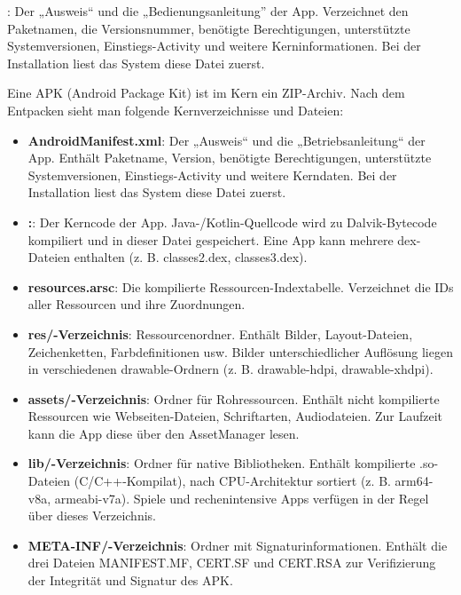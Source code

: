 
: Der „Ausweis“ und die „Bedienungsanleitung” der App. Verzeichnet den Paketnamen, die Versionsnummer, benötigte Berechtigungen, unterstützte Systemversionen, Einstiegs-Activity und weitere Kerninformationen. Bei der Installation liest das System diese Datei zuerst.


Eine APK (Android Package Kit) ist im Kern ein ZIP-Archiv. Nach dem Entpacken sieht man folgende Kernverzeichnisse und Dateien:

\begin{itemize}
  \item \textbf{AndroidManifest.xml}: Der „Ausweis“ und die „Betriebsanleitung“ der App. Enthält Paketname, Version, benötigte Berechtigungen, unterstützte Systemversionen, Einstiegs-Activity und weitere Kerndaten. Bei der Installation liest das System diese Datei zuerst.
  \item \textbf{:}: Der Kerncode der App. Java-/Kotlin-Quellcode wird zu Dalvik-Bytecode kompiliert und in dieser Datei gespeichert. Eine App kann mehrere dex-Dateien enthalten (z. B. classes2.dex, classes3.dex).
  \item \textbf{resources.arsc}: Die kompilierte Ressourcen-Indextabelle. Verzeichnet die IDs aller Ressourcen und ihre Zuordnungen.
  \item \textbf{res/-Verzeichnis}: Ressourcenordner. Enthält Bilder, Layout-Dateien, Zeichenketten, Farbdefinitionen usw. Bilder unterschiedlicher Auflösung liegen in verschiedenen drawable-Ordnern (z. B. drawable-hdpi, drawable-xhdpi).
  \item \textbf{assets/-Verzeichnis}: Ordner für Rohressourcen. Enthält nicht kompilierte Ressourcen wie Webseiten-Dateien, Schriftarten, Audiodateien. Zur Laufzeit kann die App diese über den AssetManager lesen.
  \item \textbf{lib/-Verzeichnis}: Ordner für native Bibliotheken. Enthält kompilierte .so-Dateien (C/C++-Kompilat), nach CPU-Architektur sortiert (z. B. arm64-v8a, armeabi-v7a). Spiele und rechenintensive Apps verfügen in der Regel über dieses Verzeichnis.
  \item \textbf{META-INF/-Verzeichnis}: Ordner mit Signaturinformationen. Enthält die drei Dateien MANIFEST.MF, CERT.SF und CERT.RSA zur Verifizierung der Integrität und Signatur des APK.
\end{itemize}

